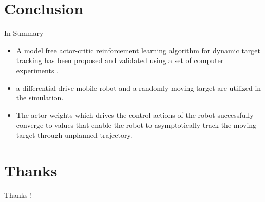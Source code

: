 \documentclass{beamer}
\begin{document}
\section{Conclusion}
\begin{frame}{In Summary}
\begin{itemize}
\item A model free actor-critic reinforcement learning algorithm for dynamic target
tracking has been proposed and validated using a set of computer experiments .
\item  a differential drive mobile robot and a randomly moving target are
utilized in the simulation. 
\item The actor weights which
drives the control actions of the robot successfully converge to values that
enable the robot to asymptotically track the moving target through unplanned
trajectory. 
\end{itemize}
\end{frame}
%
\section*{Thanks}
\begin{frame}
\begin{LARGE}
\begin{center}
Thanks !
\end{center}
\end{LARGE}
\end{frame}
\end{document}
